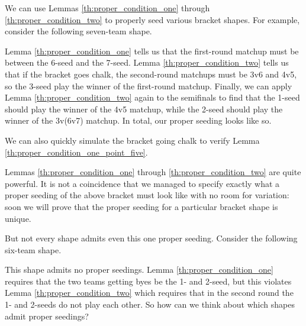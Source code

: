 {

We can use Lemmas \ref{th:proper_condition_one} through \ref{th:proper_condition_two} to properly seed various bracket shapes. For example, consider the following seven-team shape.


Lemma \ref{th:proper_condition_one} tells us that the first-round matchup must be between the 6-seed and the 7-seed. Lemma \ref{th:proper_condition_two} tells us that if the bracket goes chalk, the second-round matchups must be 3v6 and 4v5, so the 3-seed play the winner of the first-round matchup. Finally, we can apply Lemma \ref{th:proper_condition_two} again to the semifinals to find that the 1-seed should play the winner of the 4v5 matchup, while the 2-seed should play the winner of the 3v(6v7) matchup. In total, our proper seeding looks like so.


We can also quickly simulate the bracket going chalk to verify Lemma \ref{th:proper_condition_one_point_five}.

Lemmas \ref{th:proper_condition_one} through \ref{th:proper_condition_two} are quite powerful. It is not a coincidence that we managed to specify exactly what a proper seeding of the above bracket must look like with no room for variation: soon we will prove that the proper seeding for a particular bracket shape is unique. 

But not every shape admits even this one proper seeding. Consider the following six-team shape.


This shape admits no proper seedings. Lemma \ref{th:proper_condition_one} requires that the two teams getting byes be the 1- and 2-seed, but this violates Lemma \ref{th:proper_condition_two} which requires that in the second round the 1- and 2-seeds do not play each other. So how can we think about which shapes admit proper seedings?

}
